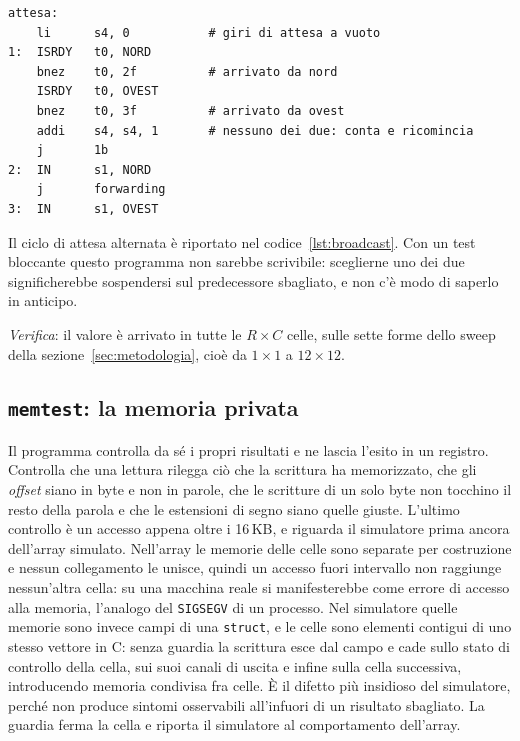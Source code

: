 \begin{lstlisting}[caption={L'attesa alternata su due direzioni in \texttt{broadcast.s}},label={lst:broadcast},language=RISCV,float=htbp]
attesa:
    li      s4, 0           # giri di attesa a vuoto
1:  ISRDY   t0, NORD
    bnez    t0, 2f          # arrivato da nord
    ISRDY   t0, OVEST
    bnez    t0, 3f          # arrivato da ovest
    addi    s4, s4, 1       # nessuno dei due: conta e ricomincia
    j       1b
2:  IN      s1, NORD
    j       forwarding
3:  IN      s1, OVEST
\end{lstlisting}
Il ciclo di attesa alternata è riportato nel codice~\ref{lst:broadcast}. Con
un test bloccante questo programma non sarebbe scrivibile: sceglierne uno
dei due significherebbe sospendersi sul predecessore sbagliato, e non c'è modo
di saperlo in anticipo.

\emph{Verifica}: il valore è arrivato in tutte le $R \times C$ celle, sulle
sette forme dello sweep della sezione~\ref{sec:metodologia}, cioè da
$1\times1$ a $12\times12$.


\subsection{\texttt{memtest}: la memoria privata}

Il programma controlla da sé i propri risultati e ne lascia l'esito in un
registro. Controlla che una lettura
rilegga ciò che la scrittura ha memorizzato, che gli \emph{offset} siano in byte
e non in parole, che le scritture di un solo byte non tocchino il resto della
parola e che le estensioni di segno siano quelle giuste. L'ultimo controllo è un
accesso appena oltre i 16\,KB, e riguarda il simulatore prima ancora
dell'array simulato. Nell'array le memorie delle celle sono separate per
costruzione e nessun collegamento le unisce, quindi un accesso fuori
intervallo non raggiunge nessun'altra cella: su una macchina reale si
manifesterebbe come errore di accesso alla memoria, l'analogo del
\texttt{SIGSEGV} di un processo. Nel simulatore quelle memorie sono invece
campi di una \texttt{struct}, e le celle sono elementi contigui di uno stesso
vettore in C: senza guardia la scrittura esce dal campo e cade sullo stato di
controllo della cella, sui suoi canali di uscita e infine sulla cella
successiva, introducendo memoria condivisa fra celle. È il difetto più
insidioso del simulatore, perché non produce sintomi osservabili all'infuori
di un risultato sbagliato. La guardia ferma la cella e riporta il simulatore
al comportamento dell'array.

